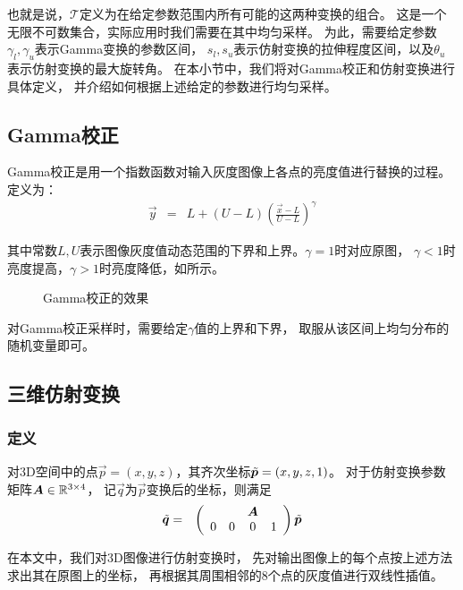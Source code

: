 也就是说，$\mathcal{T}$定义为在给定参数范围内所有可能的这两种变换的组合。
这是一个无限不可数集合，实际应用时我们需要在其中均匀采样。
为此，需要给定参数$\gamma_l, \gamma_u$表示Gamma变换的参数区间，
$s_l, s_u$表示仿射变换的拉伸程度区间，以及$\theta_u$表示仿射变换的最大旋转角。
在本小节中，我们将对Gamma校正和仿射变换进行具体定义，
并介绍如何根据上述给定的参数进行均匀采样。

\subsection{Gamma校正}
Gamma校正是用一个指数函数对输入灰度图像上各点的亮度值进行替换的过程。
定义为：
\begin{eqnarray}
    \vec{y} &=& L + (U-L)\left(\frac{\vec{x}-L}{U-L}\right)^\gamma
\end{eqnarray}

其中常数$L, U$表示图像灰度值动态范围的下界和上界。$\gamma=1$时对应原图，
$\gamma < 1$时亮度提高，$\gamma > 1$时亮度降低，如所示。

\begin{figure}[h!]
    \caption{Gamma校正的效果}
    \label{fig:cnn:aug:gamma}
\end{figure}

对Gamma校正采样时，需要给定$\gamma$值的上界和下界，
取服从该区间上均匀分布的随机变量即可。

\subsection{三维仿射变换}

\subsubsection{定义}
对3D空间中的点$\vec{p} = (x, y, z)$，其齐次坐标$\tilde{\boldsymbol{p}}=(x, y, z, 1)$。
对于仿射变换参数矩阵$\boldsymbol{A} \in \mathbb{R}^{3\times 4}$，
记$\vec{q}$为$\vec{p}$变换后的坐标，则满足
\begin{eqnarray}
    \tilde{\boldsymbol{q}} &=& \left(\begin{array}{cccc}
        & & \boldsymbol{A} & \\
        0 & 0 & 0 & 1
    \end{array}\right)\tilde{\boldsymbol{p}}
\end{eqnarray}

在本文中，我们对3D图像进行仿射变换时，
先对输出图像上的每个点按上述方法求出其在原图上的坐标，
再根据其周围相邻的$8$个点的灰度值进行双线性插值。

